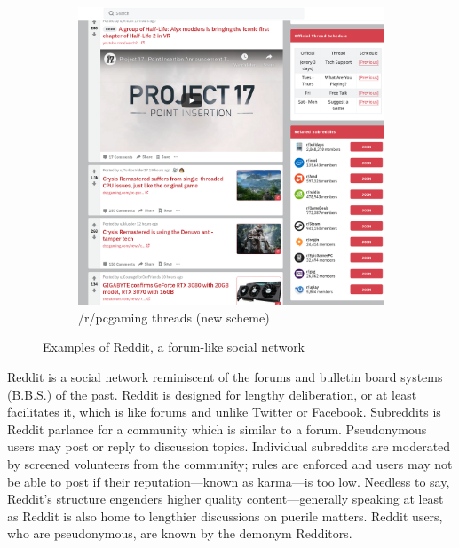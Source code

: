 \documentclass[12pt, a4paper]{article}
\begin{document}
\begin{figure}[h!]
\begin{subfigure}[b]{0.4\linewidth}
    \includegraphics[width=\linewidth]{reddit_pcgaming.png}
    \caption{/r/pcgaming threads (new scheme)}
  \end{subfigure}
  \label{fig:redditexamples}
  \caption{Examples of Reddit, a forum-like social network}
\end{figure}
Reddit is a social network reminiscent of the forums and bulletin board systems (B.B.S.) of the past. Reddit is designed for lengthy deliberation, or at least facilitates it, which is like forums and unlike Twitter or Facebook. Subreddits is Reddit parlance for a community which is similar to a forum. Pseudonymous users may post or reply to discussion topics. Individual subreddits are moderated by screened volunteers from the community; rules are enforced and users may not be able to post if their reputation---known as karma---is too low. Needless to say, Reddit's structure engenders higher quality content---generally speaking at least as Reddit is also home to lengthier discussions on puerile matters. Reddit users, who are pseudonymous, are known by the demonym Redditors.
\end{document}
